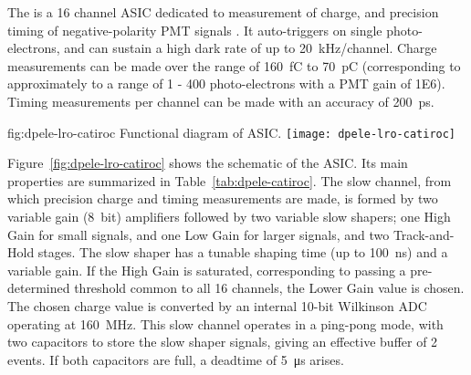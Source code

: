 The  is a \num{16} channel ASIC dedicated to measurement of charge, and precision timing of negative-polarity PMT signals \cite{Blin:2017}. It auto-triggers on single photo-electrons, and can sustain a high dark rate of up to \SI{20} {kHz/channel}. Charge measurements can be made over the range of \SI{160}{fC} to \SI{70}{pC} (corresponding to approximately to a range of \num{1} - \num{400} photo-electrons with a PMT gain of \num{1E6}). Timing measurements per channel can be made with an accuracy of \SI{200}{ps}.

\begin{dunefigure}{fig:dpele-lro-catiroc}
{Functional diagram of  ASIC.}
\texttt{[image: dpele-lro-catiroc]}
\end{dunefigure}

Figure~\ref{fig:dpele-lro-catiroc} shows the schematic of the  ASIC. Its main properties are summarized in Table~\ref{tab:dpele-catiroc}. The slow channel, from which precision charge and timing measurements are made, is formed by two variable gain (\SI{8}{bit}) amplifiers followed by two variable slow shapers; one High Gain for small signals, and one Low Gain for larger signals, and two Track-and-Hold stages. The slow shaper has a tunable shaping time (up to \SI{100}{ns}) and a variable gain.  If the High Gain is saturated, corresponding to passing a pre-determined threshold common to all 16 channels, the Lower Gain value is chosen. The chosen charge value is converted by an internal 10-bit Wilkinson ADC operating at \SI{160}{MHz}.  This slow channel operates in a ping-pong mode, with two capacitors to store the slow shaper signals, giving an effective buffer of 2 events. If both capacitors are full, a deadtime of \SI{5}{\micro\second} arises.

